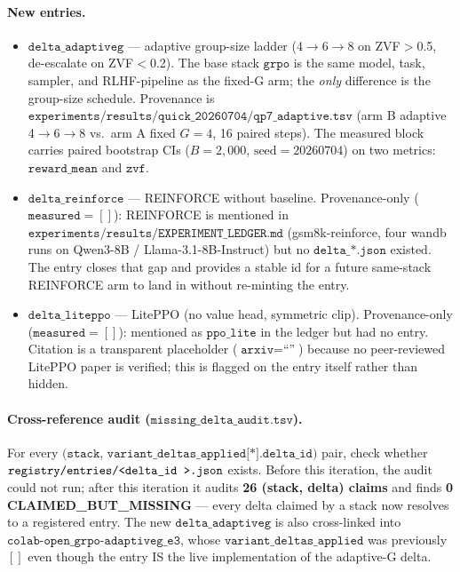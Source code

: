 \documentclass{article}
\begin{document}
\paragraph{New entries.}
\begin{itemize}
\item $\texttt{delta\_adaptiveg}$ --- adaptive group-size ladder
(4$\to$6$\to$8 on ZVF$>$0.5, de-escalate on ZVF$<$0.2). The base
stack $\texttt{grpo}$ is the same model, task, sampler, and
RLHF-pipeline as the fixed-G arm; the \emph{only} difference is the
group-size schedule. Provenance is
$\texttt{experiments/results/quick\_20260704/qp7\_adaptive.tsv}$
(arm B adaptive 4$\to$6$\to$8 vs.\ arm A fixed $G=4$, 16 paired
steps). The measured block carries paired bootstrap CIs
($B=2{,}000$, $\text{seed}=20260704$) on two metrics:
$\texttt{reward\_mean}$ and $\texttt{zvf}$.
\item $\texttt{delta\_reinforce}$ --- REINFORCE without baseline.
Provenance-only ($\texttt{measured}=[]$): REINFORCE is mentioned in
$\texttt{experiments/results/EXPERIMENT\_LEDGER.md}$ (gsm8k-reinforce,
four wandb runs on Qwen3-8B / Llama-3.1-8B-Instruct) but no
$\texttt{delta\_*.json}$ existed. The entry closes that gap and
provides a stable id for a future same-stack REINFORCE arm to land
in without re-minting the entry.
\item $\texttt{delta\_liteppo}$ --- LitePPO (no value head, symmetric
clip). Provenance-only ($\texttt{measured}=[]$): mentioned as
$\texttt{ppo\_lite}$ in the ledger but had no entry. Citation is a
transparent placeholder ($\texttt{arxiv}=\text{``''}$) because no
peer-reviewed LitePPO paper is verified; this is flagged on the
entry itself rather than hidden.
\end{itemize}

\paragraph{Cross-reference audit ($\texttt{missing\_delta\_audit.tsv}$).}
For every $\texttt{(stack, variant\_deltas\_applied[*].delta\_id)}$
pair, check whether $\texttt{registry/entries/\textless delta\_id \textgreater.json}$
exists. Before this iteration, the audit could not run; after this iteration it
audits \textbf{26 (stack, delta) claims} and finds \textbf{0
CLAIMED\_BUT\_MISSING} --- every delta claimed by a stack now
resolves to a registered entry. The new
$\texttt{delta\_adaptiveg}$ is also cross-linked into
$\texttt{colab-open\_grpo-adaptiveg\_e3}$, whose
$\texttt{variant\_deltas\_applied}$ was previously $[]$ even though
the entry IS the live implementation of the adaptive-G delta.
\end{document}
